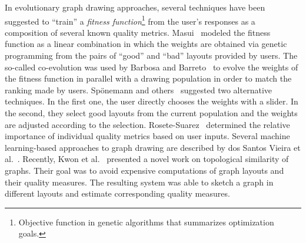 In evolutionary graph drawing approaches, several techniques have been suggested to \enquote{train} a \emph{fitness
  function}\footnote{Objective function in genetic algorithms that summarizes optimization goals.}  from the user's
responses as a composition of several known quality metrics.  Masui~\cite{Masui1994} modeled the fitness function as a
linear combination in which the weights are obtained via genetic programming from the pairs of \enquote{good} and
\enquote{bad} layouts provided by users.  The so-called co-evolution was used by Barbosa and Barreto~\cite{Barbosa2001}
to evolve the weights of the fitness function in parallel with a drawing population in order to match the ranking made
by users.  Sp\"{o}nemann and others~\cite{Sponemann14} suggested two alternative techniques.  In the first one, the user
directly chooses the weights with a slider.  In the second, they select good layouts from the current population and the
weights are adjusted according to the selection.  Rosete-Suarez~\cite{Rosete-Suarez99} determined the relative
importance of individual quality metrics based on user inputs.  Several machine learning-based approaches to graph
drawing are described by dos Santos Vieira et al.~\cite{Raissa2015}.  Recently, Kwon et al.~\cite{Kwon18} presented a
novel work on topological similarity of graphs.  Their goal was to avoid expensive computations of graph layouts and
their quality measures.  The resulting system was able to sketch a graph in different layouts and estimate corresponding
quality measures.
